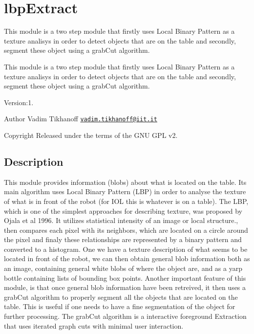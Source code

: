 \section{lbp\+Extract}
\label{group__lbpExtract}


This module is a two step module that firstly uses Local Binary Pattern as a texture analisys in order to detect objects that are on the table and secondly, segment these object using a grab\+Cut algorithm.  


This module is a two step module that firstly uses Local Binary Pattern as a texture analisys in order to detect objects that are on the table and secondly, segment these object using a grab\+Cut algorithm. 

Version\+:1. \begin{DoxyAuthor}{Author}
Vadim Tikhanoff \href{mailto:vadim.tikhanoff@iit.it}{\tt vadim.\+tikhanoff@iit.\+it} ~\newline
 
\end{DoxyAuthor}
\begin{DoxyCopyright}{Copyright}
Released under the terms of the G\+NU G\+PL v2. 
\end{DoxyCopyright}
\hypertarget{group__lbpExtract_intro_sec}{}\subsection{Description}\label{group__lbpExtract_intro_sec}
\begin{DoxyVerb}This module provides information (blobs) about what is located on the table. Its main algorithm uses Local Binary Pattern (LBP) in order to analyse the texture of what is in front of the robot (for IOL this is whatever is on a table). The LBP, which is one of the simplest approaches for describing texture, was proposed by Ojala et al 1996. It utilizes statistical intensity of an image or local structure., then compares each pixel with its neighbors, which are located on a circle around the pixel and finaly these relationships are represented by a binary pattern and converted to a histogram. One we have a texture description of what seems to be located in front of the robot, we can then obtain general blob information both as an image, containing general white blobs of where the object are, and as a yarp bottle containing lists of bounding box points.
Another important feature of this module, is that once general blob information have been retreived, it then uses a grabCut algorithm to properly segment all the objects that are located on the table. This is useful if one needs to have a fine segmentation of the object for further processing. The grabCut algorithm is a interactive foreground Extraction that uses iterated graph cuts with minimal user interaction.
\end{DoxyVerb}


